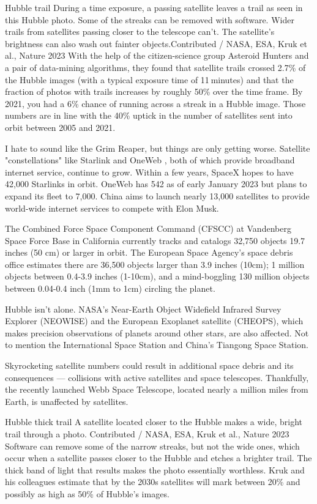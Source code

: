 Hubble trail
During a time exposure, a passing satellite leaves a trail as seen in this Hubble photo. Some of the streaks can be removed with software. Wider trails from satellites passing closer to the telescope can't. The satellite's brightness can also wash out fainter objects.Contributed / NASA, ESA, Kruk et al., Nature 2023
With the help of the citizen-science group Asteroid Hunters and a pair of data-mining algorithms, they found that satellite trails crossed 2.7\% of the Hubble images (with a typical exposure time of 11 minutes) and that the fraction of photos with trails increases by roughly 50\% over the time frame. By 2021, you had a 6\% chance of running across a streak in a Hubble image. Those numbers are in line with the 40\% uptick in the number of satellites sent into orbit between 2005 and 2021.

I hate to sound like the Grim Reaper, but things are only getting worse. Satellite "constellations" like Starlink and OneWeb , both of which provide broadband internet service, continue to grow. Within a few years, SpaceX hopes to have 42,000 Starlinks in orbit. OneWeb has 542 as of early January 2023 but plans to expand its fleet to 7,000. China aims to launch nearly 13,000 satellites to provide world-wide internet services to compete with Elon Musk.

The Combined Force Space Component Command (CFSCC) at Vandenberg Space Force Base in California currently tracks and catalogs 32,750 objects 19.7 inches (50 cm) or larger in orbit. The European Space Agency's space debris office estimates there are 36,500 objects larger than 3.9 inches (10cm); 1 million objects between 0.4-3.9 inches (1-10cm), and a mind-boggling 130 million objects between 0.04-0.4 inch (1mm to 1cm) circling the planet.


Hubble isn't alone. NASA's Near-Earth Object Widefield Infrared Survey Explorer (NEOWISE) and the European Exoplanet satellite (CHEOPS), which makes precision observations of planets around other stars, are also affected. Not to mention the International Space Station and China's Tiangong Space Station.

Skyrocketing satellite numbers could result in additional space debris and its consequences — collisions with active satellites and space telescopes. Thankfully, the recently launched Webb Space Telescope, located nearly a million miles from Earth, is unaffected by satellites.

Hubble thick trail
A satellite located closer to the Hubble makes a wide, bright trail through a photo. Contributed / NASA, ESA, Kruk et al., Nature 2023
Software can remove some of the narrow streaks, but not the wide ones, which occur when a satellite passes closer to the Hubble and etches a brighter trail. The thick band of light that results makes the photo essentially worthless. Kruk and his colleagues estimate that by the 2030s satellites will mark between 20\% and possibly as high as 50\% of Hubble's images.

